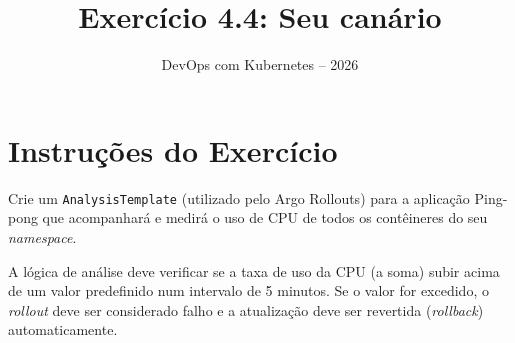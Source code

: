 \documentclass[11pt,a4paper]{article}
\title{\color{secondary}\Huge\textbf{Exercício 4.4: Seu canário}}
\author{\color{primary}DevOps com Kubernetes -- 2026}
\date{}
\begin{document}
\maketitle

\section*{\color{primary}Instruções do Exercício}
\begin{tcolorbox}[colback=blue!5!white,colframe=blue!75!black,title=Exercício 4.4: Seu canário]
Crie um \texttt{AnalysisTemplate} (utilizado pelo Argo Rollouts) para a aplicação Ping-pong que acompanhará e medirá o uso de CPU de todos os contêineres do seu \textit{namespace}.

A lógica de análise deve verificar se a taxa de uso da CPU (a soma) subir acima de um valor predefinido num intervalo de 5 minutos. Se o valor for excedido, o \textit{rollout} deve ser considerado falho e a atualização deve ser revertida (\textit{rollback}) automaticamente.
\end{tcolorbox}
\end{document}
